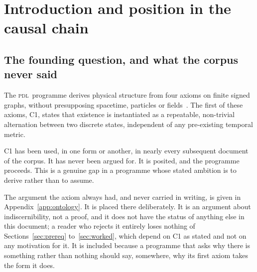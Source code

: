 \documentclass[11pt,a4paper]{article}
\newcommand{\PDL}{\textsc{pdl}}
\newcommand{\Kfour}{K_4}
\begin{document}
\begin{abstract}
Section~\ref{sec:worked} carries every object of the paper through explicitly on $\Kfour$, configuration by configuration, so that the results can be checked by hand before any script is run. Two errata in D46 are recorded and corrected against the source, and a divergence between D46's definition of the pulsation and the one derived here is recorded as an open problem. A third erratum, in D43, is also recorded: an arithmetic bridge that does not close, whose correction resolves a discrepancy of $101$ that the corpus has carried unexplained, by exhibiting it as $n_K+(\Delta n+1)^2=76+25$. Five verification scripts, exhaustive up to $n=7$, are deposited with this document under the same \textsc{doi}, with their expected outputs tabulated in Section~\ref{sec:scripts}.
\end{abstract}

\clearpage
\tableofcontents
\newpage

\section{Introduction and position in the causal chain}
\label{sec:intro}

\subsection{The founding question, and what the corpus never said}

The \PDL\ programme derives physical structure from four axioms on finite signed graphs, without presupposing spacetime, particles or fields~\citep{D01,D02}. The first of these axioms, C1, states that existence is instantiated as a repeatable, non-trivial alternation between two discrete states, independent of any pre-existing temporal metric.

C1 has been used, in one form or another, in nearly every subsequent document of the corpus. It has never been argued for. It is posited, and the programme proceeds. This is a genuine gap in a programme whose stated ambition is to derive rather than to assume.

The argument the axiom always had, and never carried in writing, is given in Appendix~\ref{app:ontology}. It is placed there deliberately. It is an argument about indiscernibility, not a proof, and it does not have the status of anything else in this document; a reader who rejects it entirely loses nothing of Sections~\ref{sec:prereq} to~\ref{sec:worked}, which depend on C1 as stated and not on any motivation for it. It is included because a programme that asks why there is something rather than nothing should say, somewhere, why its first axiom takes the form it does.
\end{document}
